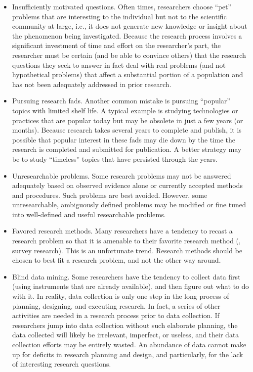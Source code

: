 \begin{itemize}
	\item Insufficiently motivated questions. Often times, researchers choose ``pet'' problems that are interesting to the individual but not to the scientific community at large, i.e., it does not generate new knowledge or insight about the phenomenon being investigated. Because the research process involves a significant investment of time and effort on the researcher's part, the researcher must be certain (and be able to convince others) that the research questions they seek to answer in fact deal with real problems (and not hypothetical problems) that affect a substantial portion of a population and has not been adequately addressed in prior research.

	\item Pursuing research fads. Another common mistake is pursuing ``popular'' topics with limited shelf life. A typical example is studying technologies or practices that are popular today but may be obsolete in just a few years (or months). Because research takes several years to complete and publish, it is possible that popular interest in these fads may die down by the time the research is completed and submitted for publication. A better strategy may be to study ``timeless'' topics that have persisted through the years.

	\item Unresearchable problems. Some research problems may not be answered adequately based on observed evidence alone or currently accepted methods and procedures. Such problems are best avoided. However, some unresearchable, ambiguously defined problems may be modified or fine tuned into well-defined and useful researchable problems.

	\item Favored research methods. Many researchers have a tendency to recast a research problem so that it is amenable to their favorite research method (\eg, survey research). This is an unfortunate trend. Research methods should be chosen to best fit a research problem, and not the other way around.

	\item Blind data mining. Some researchers have the tendency to collect data first (using instruments that are already available), and then figure out what to do with it. In reality, data collection is only one step in the long process of planning, designing, and executing research. In fact, a series of other activities are needed in a research process prior to data collection. If researchers jump into data collection without such elaborate planning, the data collected will likely be irrelevant, imperfect, or useless, and their data collection efforts may be entirely wasted. An abundance of data cannot make up for deficits in research planning and design, and particularly, for the lack of interesting research questions.


\end{itemize}
